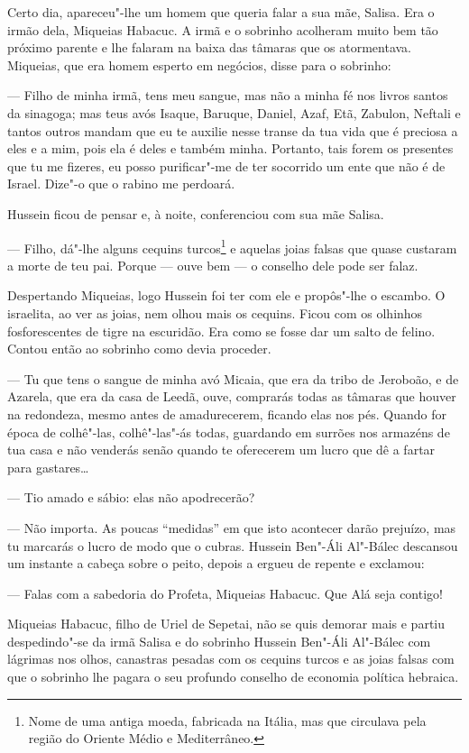 Certo dia, apareceu"-lhe um homem que queria falar a sua mãe, Salisa. Era
o irmão dela, Miqueias Habacuc. A irmã e o sobrinho acolheram muito bem
tão próximo parente e lhe falaram na baixa das tâmaras que os
atormentava. Miqueias, que era homem esperto em negócios, disse para o
sobrinho:

--- Filho de minha irmã, tens meu sangue, mas não a minha fé nos livros
santos da sinagoga; mas teus avós Isaque, Baruque, Daniel, Azaf, Etã,
Zabulon, Neftali e tantos outros mandam que eu te auxilie nesse transe
da tua vida que é preciosa a eles e a mim, pois ela é deles e também
minha. Portanto, tais forem os presentes que tu me fizeres, eu posso
purificar"-me de ter socorrido um ente que não é de Israel. Dize"-o que o
rabino me perdoará.

Hussein ficou de pensar e, à noite, conferenciou com sua mãe Salisa.

--- Filho, dá"-lhe alguns cequins turcos\footnote{Nome de uma antiga
  moeda, fabricada na Itália, mas que circulava pela região do Oriente
  Médio e Mediterrâneo.} e aquelas joias falsas que quase custaram a
morte de teu pai. Porque --- ouve bem --- o conselho dele pode ser
falaz.

Despertando Miqueias, logo Hussein foi ter com ele e propôs"-lhe o
escambo. O israelita, ao ver as joias, nem olhou mais os cequins. Ficou
com os olhinhos fosforescentes de tigre na escuridão. Era como se fosse
dar um salto de felino. Contou então ao sobrinho como devia proceder.

--- Tu que tens o sangue de minha avó Micaia, que era da tribo de
Jeroboão, e de Azarela, que era da casa de Leedã, ouve, comprarás todas
as tâmaras que houver na redondeza, mesmo antes de amadurecerem, ficando
elas nos pés. Quando for época de colhê"-las, colhê"-las"-ás todas,
guardando em surrões nos armazéns de tua casa e não venderás senão
quando te oferecerem um lucro que dê a fartar para gastares\ldots{}

--- Tio amado e sábio: elas não apodrecerão?

--- Não importa. As poucas ``medidas'' em que isto acontecer darão
prejuízo, mas tu marcarás o lucro de modo que o cubras. Hussein Ben"-Áli
Al"-Bálec descansou um instante a cabeça sobre o peito, depois a ergueu
de repente e exclamou:

--- Falas com a sabedoria do Profeta, Miqueias Habacuc. Que Alá seja
contigo!

Miqueias Habacuc, filho de Uriel de Sepetai, não se quis demorar mais e
partiu despedindo"-se da irmã Salisa e do sobrinho Hussein Ben"-Áli
Al"-Bálec com lágrimas nos olhos, canastras pesadas com os cequins turcos
e as joias falsas com que o sobrinho lhe pagara o seu profundo conselho
de economia política hebraica.

